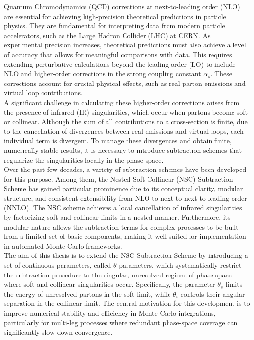 Quantum Chromodynamics (QCD) corrections at next-to-leading order (NLO) are essential for achieving high-precision theoretical predictions in particle physics. They are fundamental for interpreting data from modern particle accelerators, such as the Large Hadron Collider (LHC) at CERN. As experimental precision increases, theoretical predictions must also achieve a level of accuracy that allows for meaningful comparisons with data. This requires extending perturbative calculations beyond the leading order (LO) to include NLO and higher-order corrections in the strong coupling constant $\alpha_s$. These corrections account for crucial physical effects, such as real parton emissions and virtual loop contributions. \\
A significant challenge in calculating these higher-order corrections arises from the presence of infrared (IR) singularities, which occur when partons become soft or collinear. Although the sum of all contributions to a cross-section is finite, due to the cancellation of divergences between real emissions and virtual loops, each individual term is divergent. To manage these divergences and obtain finite, numerically stable results, it is necessary to introduce subtraction schemes that regularize the singularities locally in the phase space. \\
Over the past few decades, a variety of subtraction schemes have been developed for this purpose. Among them, the Nested Soft-Collinear (NSC) Subtraction Scheme has gained particular prominence due to its conceptual clarity, modular structure, and consistent extensibility from NLO to next-to-next-to-leading order (NNLO). The NSC scheme achieves a local cancellation of infrared singularities by factorizing soft and collinear limits in a nested manner. Furthermore, its modular nature allows the subtraction terms for complex processes to be built from a limited set of basic components, making it well-suited for implementation in automated Monte Carlo frameworks. \\
The aim of this thesis is to extend the NSC Subtraction Scheme by introducing a set of continuous parameters, called $\theta$-parameters, which systematically restrict the subtraction procedure to the singular, unresolved regions of phase space where soft and collinear singularities occur. Specifically, the parameter $\theta_s$ limits the energy of unresolved partons in the soft limit, while $\theta_i$ controls their angular separation in the collinear limit. The central motivation for this development is to improve numerical stability and efficiency in Monte Carlo integrations, particularly for multi-leg processes where redundant phase-space coverage can significantly slow down convergence. \\
